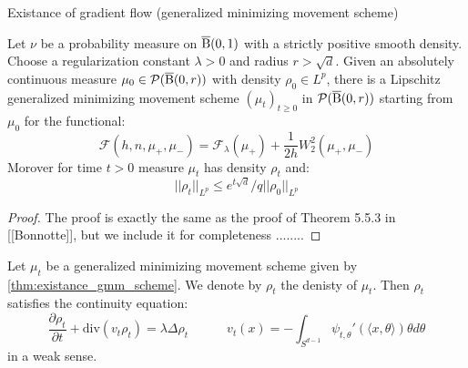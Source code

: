 Existance of gradient flow (generalized minimizing movement scheme)
\begin{thm} \label{thm:existance_gmm_scheme}
Let $\nu$ be a probability measure on $\operatorname{\overline{B}}(0,1)$ with a strictly positive smooth density. Choose a regularization constant $\lambda > 0$ and radius $r > \sqrt{d}$. Given an absolutely continuous measure $\mu_0 \in \mathcal{P}(\operatorname{\overline{B}}(0,r))$ with density $\rho_0 \in L^p$, there is a Lipschitz generalized minimizing movement scheme $(\mu_t)_{t\geq 0}$ in $\mathcal{P}(\operatorname{\overline{B}}(0,r))$ starting from $\mu_0$ for the functional:
\[
\mathcal{F}(h, n , \mu_+, \mu_-) = \mathcal{F}_{\lambda}(\mu_+) + \frac{1}{2h}W_2^2(\mu_+, \mu_-)
\]
Morover for time $t > 0$ measure $\mu_t$ has density $\rho_t$ and:
\[
||\rho_t||_{L^p} \leq e^{t\sqrt{d}}/q ||\rho_0||_{L^p}
\]
\end{thm}
\begin{proof}
The proof is exactly the same as the proof of Theorem 5.5.3 in [[Bonnotte]], but we include it for completeness   ........
\end{proof}

\begin{thm}
Let $\mu_t$ be a generalized minimizing movement scheme given by \ref{thm:existance_gmm_scheme}. We denote by $\rho_t$ the denisty of $\mu_t$. Then $\rho_t$ satisfies the continuity equation:
\[
\frac{\partial \rho_t}{\partial t} + \text{div}(v_t \rho_t) = \lambda \Delta \rho_t  \quad \quad \quad v_t(x) = - \int_{S^{d-1}} \psi_{t, \theta}'(\langle x , \theta \rangle ) \theta d\theta 
\]
in a weak sense.
\end{thm}